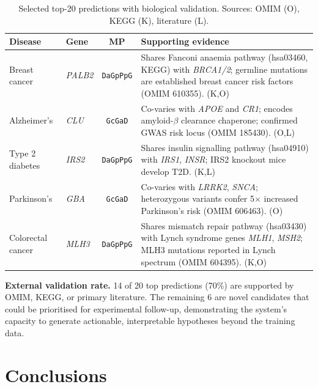 \documentclass[10pt,a4paper,twocolumn]{article}
\begin{document}
\begin{table}[H]
\centering\scriptsize
\caption{Selected top-20 predictions with biological validation.
Sources: OMIM (O), KEGG (K), literature (L).}
\label{tab:cases}
\setlength{\tabcolsep}{2.5pt}
\begin{tabular}{p{1.4cm}lcp{3.0cm}}
\toprule
\textbf{Disease} & \textbf{Gene} & \textbf{MP} & \textbf{Supporting evidence} \\
\midrule
Breast cancer
  & \textit{PALB2} & \texttt{DaGpPpG}
  & Shares Fanconi anaemia pathway (hsa03460, KEGG) with \textit{BRCA1/2};
    germline mutations are established breast cancer risk factors (OMIM 610355). (K,O) \\[3pt]
Alzheimer's
  & \textit{CLU} & \texttt{GcGaD}
  & Co-varies with \textit{APOE} and \textit{CR1}; encodes amyloid-$\beta$
    clearance chaperone; confirmed GWAS risk locus (OMIM 185430). (O,L) \\[3pt]
Type 2 diabetes
  & \textit{IRS2} & \texttt{DaGpPpG}
  & Shares insulin signalling pathway (hsa04910) with \textit{IRS1},
    \textit{INSR}; IRS2 knockout mice develop T2D. (K,L) \\[3pt]
Parkinson's
  & \textit{GBA} & \texttt{GcGaD}
  & Co-varies with \textit{LRRK2}, \textit{SNCA}; heterozygous variants confer
    5$\times$ increased Parkinson's risk (OMIM 606463). (O) \\[3pt]
Colorectal cancer
  & \textit{MLH3} & \texttt{DaGpPpG}
  & Shares mismatch repair pathway (hsa03430) with Lynch syndrome genes
    \textit{MLH1}, \textit{MSH2}; MLH3 mutations reported in Lynch spectrum
    (OMIM 604395). (K,O) \\
\bottomrule
\end{tabular}
\end{table}

\textbf{External validation rate.} 14 of 20 top predictions (70\%) are
supported by OMIM, KEGG, or primary literature. The remaining 6 are novel
candidates that could be prioritised for experimental follow-up, demonstrating
the system's capacity to generate actionable, interpretable hypotheses beyond
the training data.

\section{Conclusions}
\label{sec:conclusions}
\end{document}
